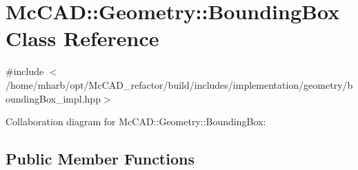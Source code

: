 \hypertarget{classMcCAD_1_1Geometry_1_1BoundingBox}{}\section{Mc\+C\+AD\+:\+:Geometry\+:\+:Bounding\+Box Class Reference}
\label{classMcCAD_1_1Geometry_1_1BoundingBox}


{\ttfamily \#include $<$/home/mharb/opt/\+Mc\+C\+A\+D\+\_\+refactor/build/includes/implementation/geometry/bounding\+Box\+\_\+impl.\+hpp$>$}



Collaboration diagram for Mc\+C\+AD\+:\+:Geometry\+:\+:Bounding\+Box\+:
\subsection*{Public Member Functions}
